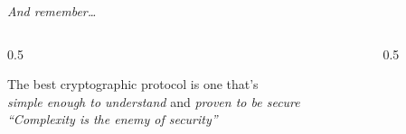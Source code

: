\ifdefined\PRESENTATION\else\PassOptionsToClass{handout}{beamer}\fi\documentclass[aspectratio=169, lualatex]{beamer}
\begin{document}
\begin{frame}{\textit{And remember\ldots}}
	\begin{columns}[c]
		\begin{column}{0.5\textwidth}
			\begin{center}
				{\Large The best cryptographic protocol is one that's\\
					\textit{simple enough to understand} and \textit{proven to be secure}} \\
				\vspace{1cm}
				{\small\textit{``Complexity is the enemy of security''}}
			\end{center}
		\end{column}
		\begin{column}{0.5\textwidth}
		\end{column}
	\end{columns}
\end{frame}

\begin{frame}[plain]
	\titlepage
\end{frame}
\end{document}
